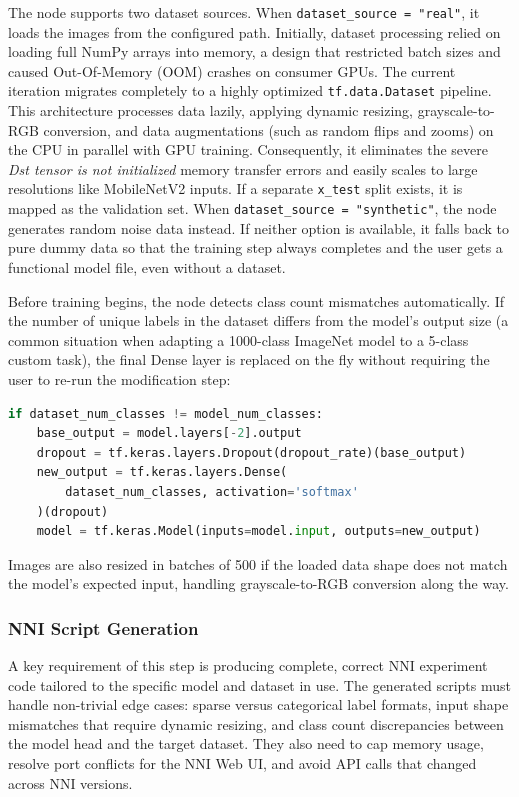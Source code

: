 The node supports two dataset sources. When \texttt{dataset\_source = "real"}, it loads the images from the configured path. Initially, dataset processing relied on loading full NumPy arrays into memory, a design that restricted batch sizes and caused Out-Of-Memory (OOM) crashes on consumer GPUs. The current iteration migrates completely to a highly optimized \texttt{tf.data.Dataset} pipeline. This architecture processes data lazily, applying dynamic resizing, grayscale-to-RGB conversion, and data augmentations (such as random flips and zooms) on the CPU in parallel with GPU training. Consequently, it eliminates the severe \textit{Dst tensor is not initialized} memory transfer errors and easily scales to large resolutions like MobileNetV2 inputs. If a separate \texttt{x\_test} split exists, it is mapped as the validation set. When \texttt{dataset\_source = "synthetic"}, the node generates random noise data instead. If neither option is available, it falls back to pure dummy data so that the training step always completes and the user gets a functional model file, even without a dataset.

Before training begins, the node detects class count mismatches automatically. If the number of unique labels in the dataset differs from the model's output size (a common situation when adapting a 1000-class ImageNet model to a 5-class custom task), the final Dense layer is replaced on the fly without requiring the user to re-run the modification step:

\begin{lstlisting}[language=Python, caption={Automatic class mismatch correction during fine-tuning}, label={lst:class_fix}]
if dataset_num_classes != model_num_classes:
    base_output = model.layers[-2].output
    dropout = tf.keras.layers.Dropout(dropout_rate)(base_output)
    new_output = tf.keras.layers.Dense(
        dataset_num_classes, activation='softmax'
    )(dropout)
    model = tf.keras.Model(inputs=model.input, outputs=new_output)
\end{lstlisting}

Images are also resized in batches of 500 if the loaded data shape does not match the model's expected input, handling grayscale-to-RGB conversion along the way.

\subsubsection{NNI Script Generation}

A key requirement of this step is producing complete, correct NNI experiment code tailored to the specific model and dataset in use. The generated scripts must handle non-trivial edge cases: sparse versus categorical label formats, input shape mismatches that require dynamic resizing, and class count discrepancies between the model head and the target dataset. They also need to cap memory usage, resolve port conflicts for the NNI Web UI, and avoid API calls that changed across NNI versions.

